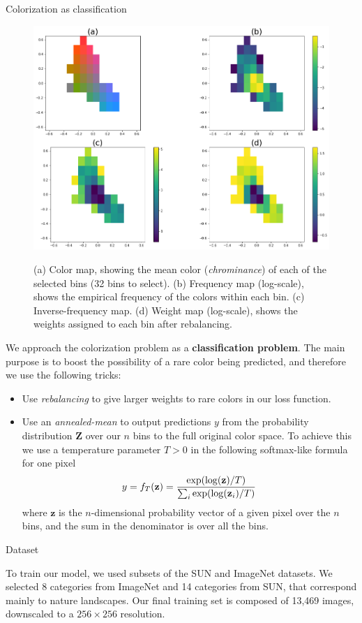 \documentclass[final]{beamer}
\newlength{\onecolwid}
\begin{document}
\begin{frame}[t]
\begin{columns}[t]
\begin{column}{\onecolwid}
\begin{block}{Colorization as classification}
  \begin{figure}
  \begin{center}
  \includegraphics[width=.5\linewidth]{cdexample}\label{good}
  \caption{ (a) Color map, showing the mean color (\textit{chrominance}) of each of the selected bins (32 bins to select). (b) Frequency map (log-scale), shows the empirical frequency of the colors within each bin. (c) Inverse-frequency map. (d) Weight map (log-scale), shows the weights assigned to each bin after rebalancing.}
  \end{center}
  \end{figure}

We approach the colorization problem as a \textbf{classification problem}. The main purpose is to boost the possibility of a rare color being predicted, and therefore we use the following tricks:
\begin{itemize}
\item Use \textit{rebalancing} to give larger weights to rare colors in our loss function.
\item Use an \textit{annealed-mean} to output predictions $y$ from the probability distribution $\textbf{Z}$ over our $n$ bins to the full original color space. To achieve this we use a temperature parameter $T > 0$ in the following softmax-like formula for one pixel $$y = f_T(\textbf{z}) = {\exp(\log(\textbf{z}) / T) \over \sum_i \exp(\log(\textbf{z}_i) / T)}$$ where $\textbf{z}$ is the $n$-dimensional probability vector of a given pixel over the $n$ bins, and the sum in the denominator is over all the bins.
\end{itemize}
  



\end{block}

\begin{block}{Dataset}

To train our model, we used subsets of the SUN and ImageNet datasets. We selected 8 categories from ImageNet and 14 categories from SUN, that correspond mainly to nature landscapes. Our final training set is composed of 13,469 images, downscaled to a $256\times 256$ resolution.


\end{block}
\end{column}
\end{columns}
\end{frame}
\end{document}
